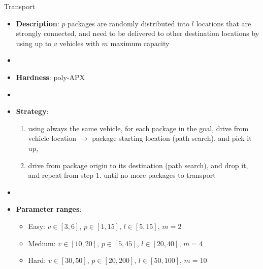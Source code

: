 \documentclass[aspectratio=169,xcolor=dvipsnames]{beamer}
\begin{document}
\begin{frame}{Transport}

    \begin{itemize}
        \item \textbf{Description}:  $p$ packages are randomly distributed into $l$ locations that are strongly connected, and need to be delivered to other destination locations  by using up to $v$ vehicles with $m$ maximum capacity
        \item[]
        \item \textbf{Hardness}: poly-APX %
        \item[]
        \item \textbf{Strategy}:
        \begin{enumerate}
            \item using always the same vehicle, for each package in the goal, drive from vehicle location $\rightarrow$ package starting location (path search), and pick it up,
            \item drive from package origin to its destination (path search), and drop it, and repeat from step 1. until no more packages to transport
        \end{enumerate}
        \item[]
        \item \textbf{Parameter ranges}:
        \begin{itemize}
            \item Easy: $v\in[3, 6]$, $p\in[1, 15]$, $l\in[5, 15]$, $m=2$
            \item Medium: $v\in[10, 20]$, $p\in[5, 45]$, $l\in[20, 40]$, $m=4$
            \item Hard: $v\in[30, 50]$, $p\in[20, 200]$, $l\in[50, 100]$, $m=10$
        \end{itemize}
    \end{itemize}

\end{frame}
\end{document}
